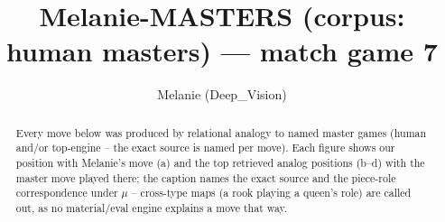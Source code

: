 \documentclass[11pt]{article}
\title{Melanie-MASTERS (corpus: human masters) — match game 7}
\author{Melanie (Deep\_Vision)}
\date{}
\begin{document}
\maketitle

\begin{abstract}Every move below was produced by relational analogy to named master games (human and/or top-engine -- the exact source is named per move). Each figure shows our position with Melanie's move (a) and the top retrieved analog positions (b--d) with the master move played there; the caption names the exact source and the piece-role correspondence under $\mu$ -- cross-type maps (a rook playing a queen's role) are called out, as no material/eval engine explains a move that way.\end{abstract}

\begin{figure}[p]\centering
\begin{subfigure}{0.46\textwidth}\centering
\resizebox{\linewidth}{!}{%
\newchessgame
\chessboard[
  setfen={r1bq1rk1/pppp1ppp/3n1b2/4R3/3P4/8/PPP2PPP/RNBQ1BK1 w - - 1 10},
  showmover=false,
  pgfstyle=straightmove, color=movearrow, markmove={e5-e1}
]}
\caption{}
\end{subfigure}\hfill
\begin{subfigure}{0.46\textwidth}\centering
\resizebox{\linewidth}{!}{%
\newchessgame
\chessboard[
  setfen={r1bqnrk1/pppp1ppp/5b2/4R3/3P4/3B4/PPP2PPP/RNBQ2K1 w - - 3 11},
  showmover=false,
  pgfstyle=straightmove, color=movearrow, markmove={e5-e1}
]}
\caption{}
\end{subfigure}
\\[4pt]
\begin{subfigure}{0.46\textwidth}\centering
\resizebox{\linewidth}{!}{%
\newchessgame
\chessboard[
  setfen={r1bqnrk1/pppp1ppp/5b2/4R3/2PP4/8/PP3PPP/RNBQ1BK1 w - - 1 11},
  showmover=false,
  pgfstyle=straightmove, color=movearrow, markmove={e5-e1}
]}
\caption{}
\end{subfigure}\hfill
\begin{subfigure}{0.46\textwidth}\centering
\resizebox{\linewidth}{!}{%
\newchessgame
\chessboard[
  setfen={r1bqnrk1/pppp1ppp/5b2/4R3/2PP4/8/PP3PPP/RNBQ1BK1 w - - 1 11},
  showmover=false,
  pgfstyle=straightmove, color=movearrow, markmove={e5-e1}
]}
\caption{}
\end{subfigure}

\end{figure}
\end{document}
